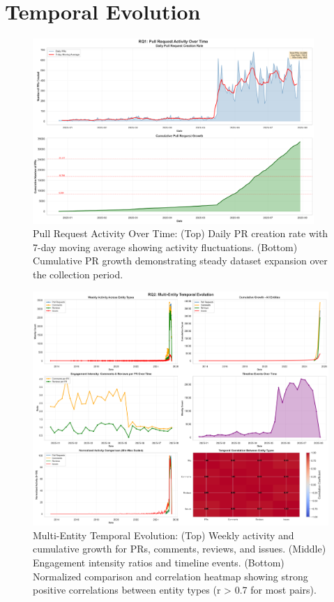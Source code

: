 \documentclass[11pt]{article}
\begin{document}
\section{Temporal Evolution}

\begin{figure}[H]
\centering
\includegraphics[width=0.95\textwidth]{figures/temporal_01_pr_growth.png}
\caption{Pull Request Activity Over Time: (Top) Daily PR creation rate with 7-day moving average showing activity fluctuations. (Bottom) Cumulative PR growth demonstrating steady dataset expansion over the collection period.}
\label{fig:temporal_pr}
\end{figure}

\begin{figure}[H]
\centering
\includegraphics[width=\textwidth]{figures/temporal_02_multi_entity_evolution.png}
\caption{Multi-Entity Temporal Evolution: (Top) Weekly activity and cumulative growth for PRs, comments, reviews, and issues. (Middle) Engagement intensity ratios and timeline events. (Bottom) Normalized comparison and correlation heatmap showing strong positive correlations between entity types (r > 0.7 for most pairs).}
\label{fig:temporal_multi}
\end{figure}
\end{document}
